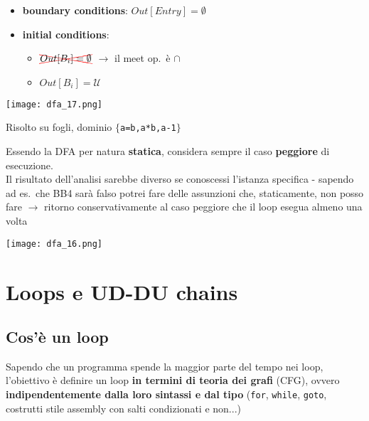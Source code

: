 \noindent\begin{minipage}[c]{.5\textwidth}
\begin{itemize}
  \item \textbf{boundary conditions}: $Out[Entry] = \emptyset$
  \item \textbf{initial conditions}:
    \begin{itemize}
      \item $\textcolor{red}{\xcancel{\textcolor{black}{Out[B_{i}] = \emptyset}}}$ $\rightarrow$ il meet op.~\`e $\cap$
      \item $Out[B_{i}] = \mathcal{U}$
    \end{itemize}
\end{itemize}
\end{minipage}\hfill
\begin{minipage}[c]{.4\textwidth}
\texttt{[image: dfa\_17.png]}
\end{minipage}

\begin{example}
\noindent\begin{minipage}[c]{.65\textwidth}
  Risolto su fogli, dominio $\lbrace$\lstinline|a=b,a*b,a-1|$\rbrace$
\begin{emphasize}
  Essendo la DFA per natura \textbf{statica}, considera sempre il caso \textbf{peggiore} di esecuzione.\\
  Il risultato dell'analisi sarebbe diverso se conoscessi l'istanza specifica - sapendo ad es.~che BB4 sar\`a falso potrei fare delle assunzioni che, staticamente, non posso fare $\rightarrow$ ritorno conservativamente al caso peggiore che il loop esegua almeno una volta
\end{emphasize}
\end{minipage}\hfill
\begin{minipage}[c]{.3\textwidth}
\texttt{[image: dfa\_16.png]}
\end{minipage}
\end{example}

\section{Loops e UD-DU chains}

\subsection{Cos'\`e un loop}

Sapendo che un programma spende la maggior parte del tempo nei loop, l'obiettivo \`e definire un loop \textbf{in termini di teoria dei grafi} (CFG), ovvero \textbf{indipendentemente dalla loro sintassi e dal tipo} (\lstinline|for|, \lstinline|while|, \lstinline|goto|, costrutti stile assembly con salti condizionati e non...)\\


